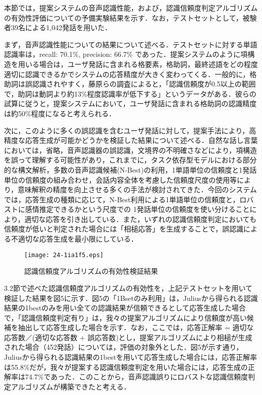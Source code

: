 \documentclass[japanese]{jnlp_1.4}
\begin{document}
本節では，提案システムの音声認識性能，および，認識信頼度判定アルゴリズムの有効性評価についての予備実験結果を示す．なお，テストセットとして，被験者39名による1,042発話を用いた．

まず，音声認識性能についての結果について述べる．テストセットに対する単語認識率は，recall: 70.1\%, precision: 66.7\% であった．提案システムのように項構造を用いる場合は，ユーザ発話に含まれる格要素，格助詞，最終述語をどの程度適切に認識できるかでシステムの応答精度が大きく変わってくる．一般的に，格助詞は誤認識されやすく，藤原らの調査\cite{no43}によると，「認識信頼度が0.5以上の範囲で，助詞は動詞より約13\%程度認識率が低下する」というデータがある．彼らの試算に従うと，提案システムにおいて，ユーザ発話に含まれる格助詞の認識精度は約50\%程度になると考えられる．

次に，このように多くの誤認識を含むユーザ発話に対して，提案手法により，高精度な応答生成が可能かどうかを検証した結果について述べる．自然な話し言葉においては，省略，音声認識器の誤認識，文境界の不明確さなどにより，項構造を誤って理解する可能性があり，これまでに，タスク依存型モデルにおける部分的な構文解析，多数の音声認識候補(N-Best)の利用，1単語単位の信頼度と1発話単位の信頼度の組み合わせ，会話内容全体を考慮した信頼度尺度の使用等により，意味解釈の精度を向上させる多くの手法が検討されてきた\cite{no44}．今回のシステムでは，応答生成の種類に応じて，N-Best利用による1単語単位の信頼度と，ロバストに感情推定できるかという尺度での
\linebreak
1発話単位の信頼度を使い分けることにより，適切な応答を引き出している．また，いずれの認識信頼度判定においても信頼度が低いと判定された場合には「相槌応答」を生成することで，誤認識による不適切な応答生成を最小限にしている．

\begin{figure}[t]
\begin{center}
\texttt{[image: 24-1ia1f5.eps]}
\end{center}
\caption{認識信頼度アルゴリズムの有効性検証結果}
\label{fig:5}
\end{figure}

3.2節で述べた認識信頼度アルゴリズムの有効性を，上記テストセットを用いて検証した結果を図5に示す．図5の「1Bsetのみ利用」は，Juliusから得られる認識結果の1bestのみを用い全ての認識結果が信頼できるとして応答生成した場合で，「認識信頼度判定有り」は，我々の提案アルゴリズムにより信頼度が高い候補を抽出して応答生成した場合を示す．なお，ここでは，応答正解率 = 適切な応答数／(適切な応答数 + 誤応答数)とし，提案アルゴリズムにより相槌が生成された場合（452発話）については，評価の対象外とした．図5が示す通り，Juliusから得られる認識結果の1bestを用いて応答生成した場合には，応答正解率は55.8\%だが，我々が提案する認識信頼度判定を用いた場合には，応答生成の正解率は74.7\%であった．このことから，音声認識誤りにロバストな認識信頼度判定アルゴリズムが構築できたと考える．
\end{document}
